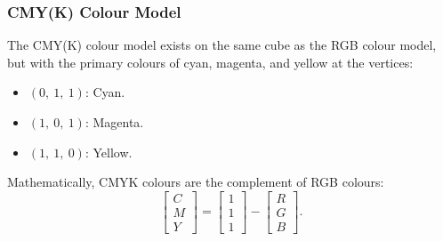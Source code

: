 \documentclass{article}
\begin{document}
\subsubsection{CMY(K) Colour Model}
The CMY(K) colour model exists on the same cube as the RGB colour
model, but with the primary colours of cyan, magenta, and yellow at the
vertices:
\begin{itemize}
    \item \(\left( 0,\: 1,\: 1 \right)\): Cyan.
    \item \(\left( 1,\: 0,\: 1 \right)\): Magenta.
    \item \(\left( 1,\: 1,\: 0 \right)\): Yellow.
\end{itemize}
Mathematically, CMYK colours are the complement of RGB colours:
\begin{equation*}
    \begin{bmatrix}
        C \\
        M \\
        Y
    \end{bmatrix}
    =
    \begin{bmatrix}
        1 \\
        1 \\
        1
    \end{bmatrix}
    -
    \begin{bmatrix}
        R \\
        G \\
        B
    \end{bmatrix}
    .
\end{equation*}
\end{document}
